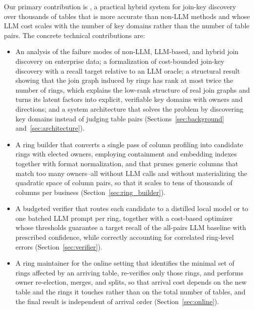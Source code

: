 Our primary contribution is \ourmethod, a practical hybrid system for join-key discovery over thousands of tables that is more accurate than non-LLM methods and whose LLM cost scales with the number of key domains rather than the number of table pairs. The concrete technical contributions are:
\begin{itemize}[leftmargin=*]
\item An analysis of the failure modes of non-LLM, LLM-based, and hybrid join discovery on enterprise data; a formalization of cost-bounded join-key discovery with a recall target relative to an LLM oracle; a structural result showing that the join graph induced by rings has rank at most twice the number of rings, which explains the low-rank structure of real join graphs and turns its latent factors into explicit, verifiable key domains with owners and directions; and a system architecture that solves the problem by discovering key domains instead of judging table pairs (Sections~\ref{sec:background} and~\ref{sec:architecture}).
\item A ring builder that converts a single pass of column profiling into candidate rings with elected owners, employing containment and embedding indexes together with format normalization, and that prunes generic columns that match too many owners--all without LLM calls and without materializing the quadratic space of column pairs, so that it scales to tens of thousands of columns per business (Section~\ref{sec:ring_builder}).
\item A budgeted verifier that routes each candidate to a distilled local model or to one batched LLM prompt per ring, together with a cost-based optimizer whose thresholds guarantee a target recall of the all-pairs LLM baseline with prescribed confidence, while correctly accounting for correlated ring-level errors (Section~\ref{sec:verifier}).
\item A ring maintainer for the online setting that identifies the minimal set of rings affected by an arriving table, re-verifies only those rings, and performs owner re-election, merges, and splits, so that arrival cost depends on the new table and the rings it touches rather than on the total number of tables, and the final result is independent of arrival order (Section~\ref{sec:online}).

\end{itemize}
